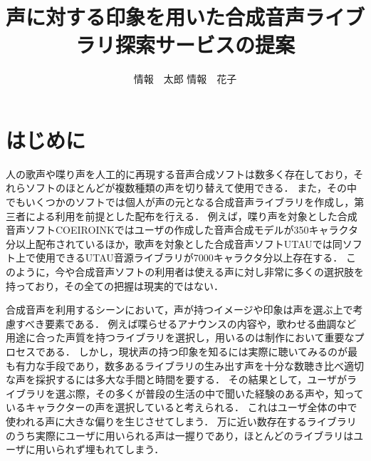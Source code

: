 \documentclass[a4j,8pt,twocolumn]{extarticle}
\title{声に対する印象を用いた合成音声ライブラリ探索サービスの提案}
\author{情報　太郎 \qquad 情報　花子}
\affiliation{情報大学情報学部}
\begin{document}
\maketitle
\thispagestyle{empty}	%

\section{はじめに}

人の歌声や喋り声を人工的に再現する音声合成ソフトは数多く存在しており，それらソフトのほとんどが複数種類の声を切り替えて使用できる．
また，その中でもいくつかのソフトでは個人が声の元となる合成音声ライブラリを作成し，第三者による利用を前提とした配布を行える．
例えば，喋り声を対象とした合成音声ソフトCOEIROINKではユーザの作成した音声合成モデルが350キャラクタ分以上配布されているほか\cite{mycoeiroink}，歌声を対象とした合成音声ソフトUTAUでは同ソフト上で使用できるUTAU音源ライブラリが7000キャラクタ分以上存在する\cite{vdbutau}．
このように，今や合成音声ソフトの利用者は使える声に対し非常に多くの選択肢を持っており，その全ての把握は現実的ではない．

合成音声を利用するシーンにおいて，声が持つイメージや印象は声を選ぶ上で考慮すべき要素である．
例えば喋らせるアナウンスの内容や，歌わせる曲調など用途に合った声質を持つライブラリを選択し，用いるのは制作において重要なプロセスである．
しかし，現状声の持つ印象を知るには実際に聴いてみるのが最も有力な手段であり，数多あるライブラリの生み出す声を十分な数聴き比べ適切な声を採択するには多大な手間と時間を要する．
その結果として，ユーザがライブラリを選ぶ際，その多くが普段の生活の中で聞いた経験のある声や，知っているキャラクターの声を選択していると考えられる．
これはユーザ全体の中で使われる声に大きな偏りを生じさせてしまう．
万に近い数存在するライブラリのうち実際にユーザに用いられる声は一握りであり，ほとんどのライブラリはユーザに用いられず埋もれてしまう．
\end{document}
